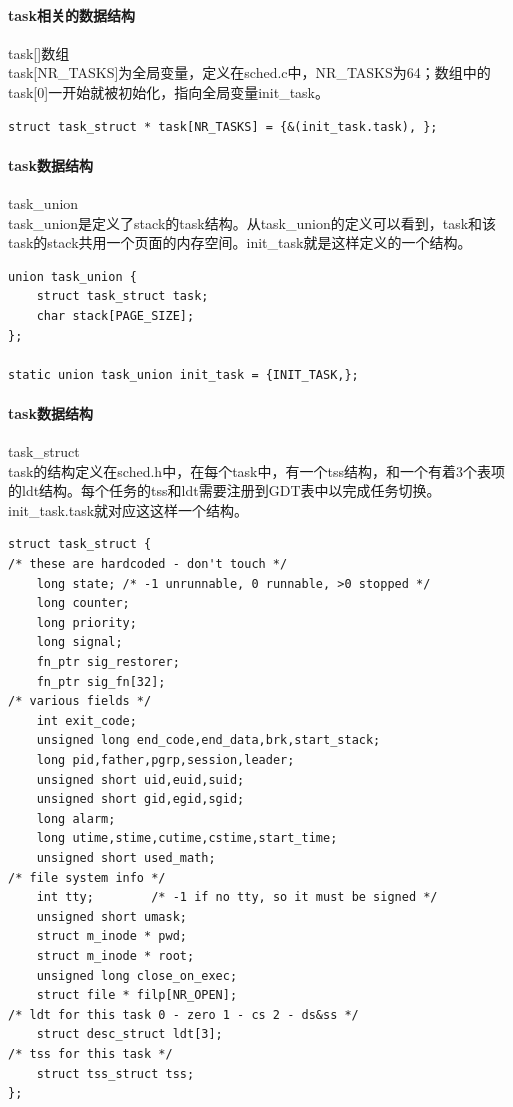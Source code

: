 \documentclass[12pt]{article}
\begin{document}
\paragraph{task相关的数据结构} task[]数组\\
task[NR\_TASKS]为全局变量，定义在sched.c中，NR\_TASKS为64；数组中的task[0]一开始就被初始化，指向全局变量init\_task。
\begin{lstlisting}[breaklines]
struct task_struct * task[NR_TASKS] = {&(init_task.task), };
\end{lstlisting}
\paragraph{task数据结构} task\_union\\
task\_union是定义了stack的task结构。从task\_union的定义可以看到，task和该task的stack共用一个页面的内存空间。init\_task就是这样定义的一个结构。
\begin{lstlisting}[breaklines]
union task_union {
	struct task_struct task;
	char stack[PAGE_SIZE];
};

static union task_union init_task = {INIT_TASK,};
\end{lstlisting}
\paragraph{task数据结构} task\_struct\\
task的结构定义在sched.h中，在每个task中，有一个tss结构，和一个有着3个表项的ldt结构。每个任务的tss和ldt需要注册到GDT表中以完成任务切换。init\_task.task就对应这这样一个结构。
\begin{lstlisting}[breaklines]
struct task_struct {
/* these are hardcoded - don't touch */
	long state;	/* -1 unrunnable, 0 runnable, >0 stopped */
	long counter;
	long priority;
	long signal;
	fn_ptr sig_restorer;
	fn_ptr sig_fn[32];
/* various fields */
	int exit_code;
	unsigned long end_code,end_data,brk,start_stack;
	long pid,father,pgrp,session,leader;
	unsigned short uid,euid,suid;
	unsigned short gid,egid,sgid;
	long alarm;
	long utime,stime,cutime,cstime,start_time;
	unsigned short used_math;
/* file system info */
	int tty;		/* -1 if no tty, so it must be signed */
	unsigned short umask;
	struct m_inode * pwd;
	struct m_inode * root;
	unsigned long close_on_exec;
	struct file * filp[NR_OPEN];
/* ldt for this task 0 - zero 1 - cs 2 - ds&ss */
	struct desc_struct ldt[3];
/* tss for this task */
	struct tss_struct tss;
};
\end{lstlisting}
\end{document}
